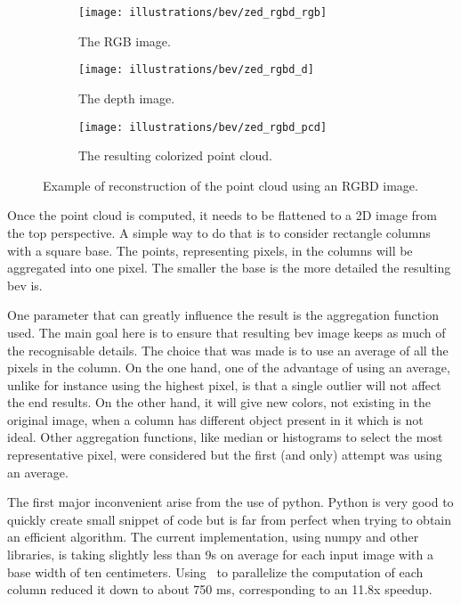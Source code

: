 \begin{figure}[ht!]
    \centering
    \begin{subfigure}[t]{0.32\textwidth}
        \centering
        \texttt{[image: illustrations/bev/zed\_rgbd\_rgb]}
        \caption{The RGB image.}
        \label{fig:pcd_rgbd:rgb}
    \end{subfigure}
    \hfill
    \begin{subfigure}[t]{0.32\textwidth}
        \centering
        \texttt{[image: illustrations/bev/zed\_rgbd\_d]}
        \caption{The depth image.}
        \label{fig:pcd_rgbd:depth}
    \end{subfigure}
    \hfill
    \begin{subfigure}[t]{0.32\textwidth}
        \centering
        \texttt{[image: illustrations/bev/zed\_rgbd\_pcd]}
        \caption{The resulting colorized point cloud.}
        \label{fig:pcd_rgbd:pcd}
    \end{subfigure}
    \caption{Example of reconstruction of the point cloud using an RGBD image.}
    \label{fig:pcd_rgbd:pcd_construction}
\end{figure}

Once the point cloud is computed, it needs to be flattened to a 2D image from the top perspective.
A simple way to do that is to consider rectangle columns with a square base.
The points, representing pixels, in the columns will be aggregated into one pixel.
The smaller the base is the more detailed the resulting \gls{bev} is.

One parameter that can greatly influence the result is the aggregation function used.
The main goal here is to ensure that resulting \gls{bev} image keeps as much of the recognisable details.
The choice that was made is to use an average of all the pixels in the column.
On the one hand, one of the advantage of using an average, unlike for instance using the highest pixel, is that a single outlier will not affect the end results.
On the other hand, it will give new colors, not existing in the original image, when a column has different object present in it which is not ideal.
Other aggregation functions, like median or histograms to select the most representative pixel, were considered but the first (and only)
attempt was using an average.

The first major inconvenient arise from the use of python.
Python is very good to quickly create small snippet of code but is far from perfect when trying to obtain an efficient algorithm.
The current implementation, using numpy and other libraries, is taking slightly less than 9s on average for each input image with a base width of ten centimeters.
Using~\cite{lam_numba_2015} to parallelize the computation of each column reduced it down to about 750 ms, corresponding to an 11.8x speedup.

